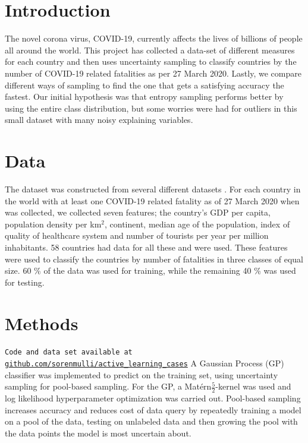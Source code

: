 \documentclass[fleqn]{article}
\begin{document}
\begin{multicols}{2}
	
	
	\section{Introduction} %
	The novel corona virus, COVID-19, currently affects the lives of billions of people all around the world. This project has collected a data-set of different measures for each country and then uses uncertainty sampling to classify countries by the number of COVID-19 related fatalities as per 27 March 2020. Lastly, we compare different ways of sampling to find the one that gets a satisfying accuracy the fastest. Our initial hypothesis was that entropy sampling performs better by using the entire class distribution, but some worries were had for outliers in this small dataset with many noisy explaining variables. 
	
	\section{Data}
	The dataset was constructed from several different datasets \cite{density, corona, alder, bnp, region, healthcare, turist}. For each country in the world with at least one COVID-19 related fatality as of 27 March 2020 when \cite{corona} was collected, we collected seven features; the country's GDP per capita, population density per km$^2$, continent, median age of the population, index of quality of healthcare system and number of tourists per year per million inhabitants. 58 countries had data for all these and were used. These features were used to classify the countries by number of fatalities in three classes of equal size. 60 \% of the data was used for training, while the remaining 40 \% was used for testing. %

	\section{Methods}
	\texttt{Code and data set available at \url{github.com/sorenmulli/active_learning_cases}} \newline
	A Gaussian Process (GP) classifier was implemented to predict on the training set, using uncertainty sampling for pool-based sampling. For the GP, a Matérn$\frac{5}{2}$-kernel was used and log likelihood hyperparameter optimization was carried out. Pool-based sampling increases accuracy and reduces cost of data query by repeatedly training a model on a pool of the data, testing on unlabeled data and then growing the pool with the data points the model is most uncertain about. 


\end{multicols}
\end{document}
